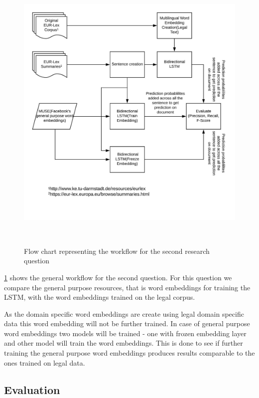 \begin{figure}[!ht]
    \centering
    \includegraphics[width=15cm, height=14cm,keepaspectratio]{pics/flowforQuestion2.jpeg}
    \caption{Flow chart representing the workflow for the second research question}
    \label{fig:FlowResearchQuestion2}
\end{figure}

\ref{fig:FlowResearchQuestion2} shows the general workflow for the second question. For this question we compare the general purpose resources, that is word embeddings for training the LSTM, with the word embeddings trained on the legal corpus. 

As the domain specific word embeddings are create using legal domain specific data this word embedding will not be further trained. In case of general purpose word embeddings two models will be trained - one with frozen embedding layer and other model will train the word embeddings. This is done to see if further training the general purpose word embeddings produces results comparable to the ones trained on legal data.

\subsection*{Evaluation}

